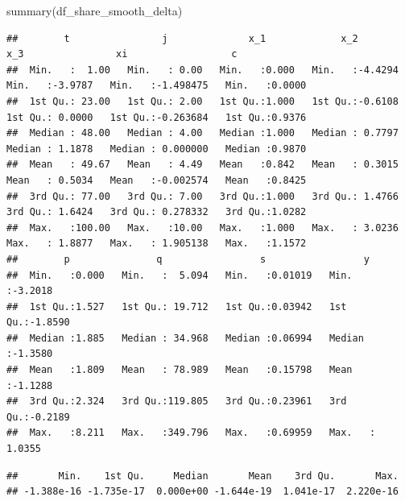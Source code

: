 \documentclass[
]{book}
\newenvironment{Shaded}{\begin{snugshade}}{\end{snugshade}}
\newcommand{\FunctionTok}[1]{\textcolor[rgb]{0.00,0.00,0.00}{#1}}
\newcommand{\NormalTok}[1]{#1}
\newcommand{\SpecialCharTok}[1]{\textcolor[rgb]{0.00,0.00,0.00}{#1}}
\begin{document}
\begin{Shaded}
\begin{Highlighting}[]
\FunctionTok{summary}\NormalTok{(df\_share\_smooth\_delta)}
\end{Highlighting}
\end{Shaded}

\begin{verbatim}
##        t                j              x_1             x_2               x_3                xi                  c         
##  Min.   :  1.00   Min.   : 0.00   Min.   :0.000   Min.   :-4.4294   Min.   :-3.9787   Min.   :-1.498475   Min.   :0.0000  
##  1st Qu.: 23.00   1st Qu.: 2.00   1st Qu.:1.000   1st Qu.:-0.6108   1st Qu.: 0.0000   1st Qu.:-0.263684   1st Qu.:0.9376  
##  Median : 48.00   Median : 4.00   Median :1.000   Median : 0.7797   Median : 1.1878   Median : 0.000000   Median :0.9870  
##  Mean   : 49.67   Mean   : 4.49   Mean   :0.842   Mean   : 0.3015   Mean   : 0.5034   Mean   :-0.002574   Mean   :0.8425  
##  3rd Qu.: 77.00   3rd Qu.: 7.00   3rd Qu.:1.000   3rd Qu.: 1.4766   3rd Qu.: 1.6424   3rd Qu.: 0.278332   3rd Qu.:1.0282  
##  Max.   :100.00   Max.   :10.00   Max.   :1.000   Max.   : 3.0236   Max.   : 1.8877   Max.   : 1.905138   Max.   :1.1572  
##        p               q                 s                 y          
##  Min.   :0.000   Min.   :  5.094   Min.   :0.01019   Min.   :-3.2018  
##  1st Qu.:1.527   1st Qu.: 19.712   1st Qu.:0.03942   1st Qu.:-1.8590  
##  Median :1.885   Median : 34.968   Median :0.06994   Median :-1.3580  
##  Mean   :1.809   Mean   : 78.989   Mean   :0.15798   Mean   :-1.1288  
##  3rd Qu.:2.324   3rd Qu.:119.805   3rd Qu.:0.23961   3rd Qu.:-0.2189  
##  Max.   :8.211   Max.   :349.796   Max.   :0.69959   Max.   : 1.0355
\end{verbatim}

\begin{Shaded}
\end{Shaded}

\begin{verbatim}
##       Min.    1st Qu.     Median       Mean    3rd Qu.       Max. 
## -1.388e-16 -1.735e-17  0.000e+00 -1.644e-19  1.041e-17  2.220e-16
\end{verbatim}
\end{document}
